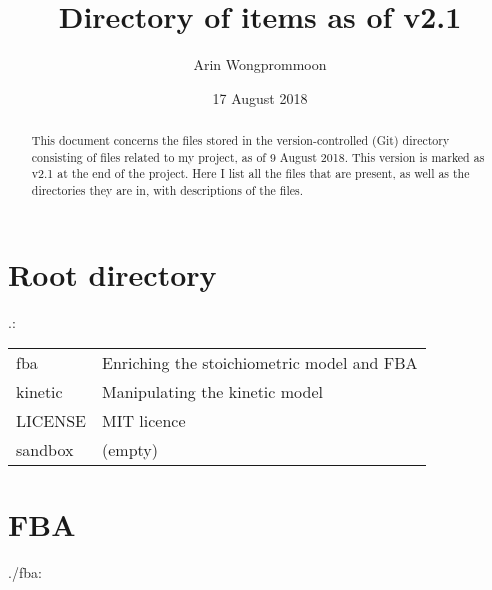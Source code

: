 \documentclass[a4paper, parskip=full]{scrreprt}
\author{Arin Wongprommoon}
\title{Directory of items as of v2.1}
\date{17 August 2018}
\begin{document}
\maketitle

\tableofcontents

\begin{abstract}
  This document concerns the files stored in the version-controlled (Git) directory consisting of files related to my project, as of 9 August 2018. This version is marked as v2.1 at the end of the project. Here I list all the files that are present, as well as the directories they are in, with descriptions of the files.
  \end{abstract}

\setlength{\LTleft}{0pt}

\chapter{Root directory}
\label{ch:root}
.:

\begin{longtable}{ll}
fba & Enriching the stoichiometric model and FBA\\
kinetic & Manipulating the kinetic model\\
LICENSE & MIT licence\\
sandbox & (empty)
\end{longtable}

\chapter{FBA}
\label{ch:fba}
./fba:
\end{document}

